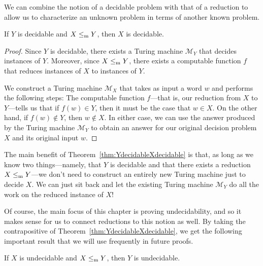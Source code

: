 We can combine the notion of a decidable problem with that of a reduction to allow us to characterize an unknown problem in terms of another known problem.

\begin{theorem}\label{thm:YdecidableXdecidable}
If $Y$ is decidable and $X \leq_{\mathrm{m}} Y$, then $X$ is decidable.

\begin{proof}
Since $Y$ is decidable, there exists a Turing machine $\mathcal{M}_{Y}$ that decides instances of $Y$. Moreover, since $X \leq_{\mathrm{m}} Y$, there exists a computable function $f$ that reduces instances of $X$ to instances of $Y$.

We construct a Turing machine $\mathcal{M}_{X}$ that takes as input a word $w$ and performs the following steps:
The computable function $f$---that is, our reduction from $X$ to $Y$---tells us that if $f(w) \in Y$, then it must be the case that $w \in X$. On the other hand, if $f(w) \not\in Y$, then $w \not\in X$. In either case, we can use the answer produced by the Turing machine $\mathcal{M}_{Y}$ to obtain an answer for our original decision problem $X$ and its original input $w$.
\end{proof}
\end{theorem}
\noindent
The main benefit of Theorem~\ref{thm:YdecidableXdecidable} is that, as long as we know two things---namely, that $Y$ is decidable and that there exists a reduction $X \leq_{\mathrm{m}} Y$---we don't need to construct an entirely new Turing machine just to decide $X$. We can just sit back and let the existing Turing machine $\mathcal{M}_{Y}$ do all the work on the reduced instance of $X$!

Of course, the main focus of this chapter is proving undecidability, and so it makes sense for us to connect reductions to this notion as well. By taking the contrapositive of Theorem~\ref{thm:YdecidableXdecidable}, we get the following important result that we will use frequently in future proofs.

\begin{corollary}\label{cor:XundecidableYundecidable}
If $X$ is undecidable and $X \leq_{\mathrm{m}} Y$, then $Y$ is undecidable.
\end{corollary}

